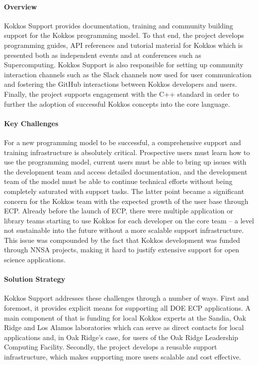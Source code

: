 \paragraph{Overview} 
Kokkos Support provides documentation, training and community building support for the Kokkos programming model. 
To that end, the project develops programming guides, API references and tutorial material for Kokkos which is presented both as independent events and at conferences such as Supercomputing.
Kokkos Support is also responsible for setting up community interaction channels such as the Slack channels now used for user communication and fostering the GitHub interactions between Kokkos developers and users.
Finally, the project supports engagement with the C++ standard in order to further the adoption of successful Kokkos concepts into the core language. 

\paragraph{Key Challenges}
For a new programming model to be successful, a comprehensive support and training infrastructure is absolutely critical. 
Prospective users must learn how to use the programming model, current users must be able to bring up issues with the development team and access detailed documentation, and the development team of the model must be able to continue technical efforts without being completely saturated with support tasks. 
The latter point became a significant concern for the Kokkos team with the expected growth of the user base through ECP.  
Already before the launch of ECP, there were multiple application or library teams starting to use Kokkos for each developer on the core team -- a level not sustainable into the future without a more scalable support infrastructure. 
This issue was compounded by the fact that Kokkos development was funded through NNSA projects, making it hard to justify extensive support for open science applications. 

\paragraph{Solution Strategy}

Kokkos Support addresses these challenges through a number of ways. 
First and foremost, it provides explicit means for supporting all DOE ECP applications. 
A main component of that is funding for local Kokkos experts at the Sandia, Oak Ridge and Los Alamos laboratories which can serve as direct contacts for local applications and, in Oak Ridge's case, for users of the Oak Ridge Leadership Computing Facility. 
Secondly, the project develops a reusable support infrastructure, which makes supporting more users scalable and cost effective. 

